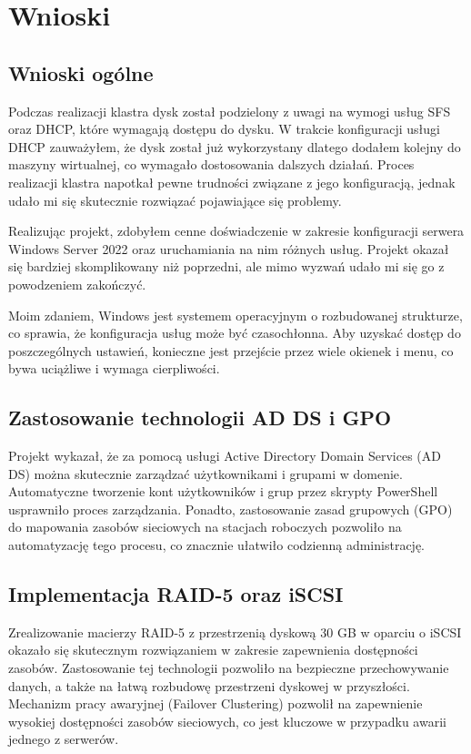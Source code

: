 	\newpage
\section{Wnioski}	%

\subsection{Wnioski ogólne}
Podczas realizacji klastra dysk został podzielony z uwagi na wymogi usług SFS oraz DHCP, które wymagają dostępu do dysku. W trakcie konfiguracji usługi DHCP zauważyłem, że dysk został już wykorzystany dlatego dodałem kolejny do maszyny wirtualnej, co wymagało dostosowania dalszych działań. Proces realizacji klastra napotkał pewne trudności związane z jego konfiguracją, jednak udało mi się skutecznie rozwiązać pojawiające się problemy.

Realizując projekt, zdobyłem cenne doświadczenie w zakresie konfiguracji serwera Windows Server 2022 oraz uruchamiania na nim różnych usług. Projekt okazał się bardziej skomplikowany niż poprzedni, ale mimo wyzwań udało mi się go z powodzeniem zakończyć.

Moim zdaniem, Windows jest systemem operacyjnym o rozbudowanej strukturze, co sprawia, że konfiguracja usług może być czasochłonna. Aby uzyskać dostęp do poszczególnych ustawień, konieczne jest przejście przez wiele okienek i menu, co bywa uciążliwe i wymaga cierpliwości.



\subsection{Zastosowanie technologii AD DS i GPO}
Projekt wykazał, że za pomocą usługi Active Directory Domain Services (AD DS) można skutecznie zarządzać użytkownikami i grupami w domenie. Automatyczne tworzenie kont użytkowników i grup przez skrypty PowerShell usprawniło proces zarządzania. Ponadto, zastosowanie zasad grupowych (GPO) do mapowania zasobów sieciowych na stacjach roboczych pozwoliło na automatyzację tego procesu, co znacznie ułatwiło codzienną administrację.

\subsection{Implementacja RAID-5 oraz iSCSI}
Zrealizowanie macierzy RAID-5 z przestrzenią dyskową 30 GB w oparciu o iSCSI okazało się skutecznym rozwiązaniem w zakresie zapewnienia dostępności zasobów. Zastosowanie tej technologii pozwoliło na bezpieczne przechowywanie danych, a także na łatwą rozbudowę przestrzeni dyskowej w przyszłości. Mechanizm pracy awaryjnej (Failover Clustering) pozwolił na zapewnienie wysokiej dostępności zasobów sieciowych, co jest kluczowe w przypadku awarii jednego z serwerów.

